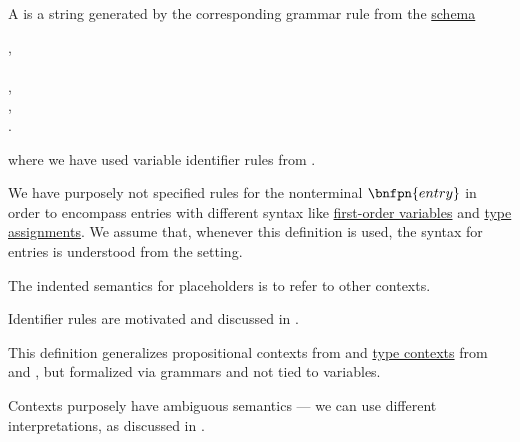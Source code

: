 \begin{definition}\label{def:logical_context}\mimprovised
  A  is a string generated by the corresponding grammar rule from the \hyperref[def:formal_grammar/schema]{schema}
  \begin{bnf*}
           {}, \\
      { \bnfor {} \bnfor} \\
    , \\
         {\bnfes}, \\
               { \bnfor {}}.
  \end{bnf*}
  where we have used variable identifier rules from .
\end{definition}
\begin{comments}
  \item We have purposely not specified rules for the nonterminal \( \bnfpn{entry} \) in order to encompass entries with different syntax like \hyperref[def:first_order_syntax/var]{first-order variables} and \hyperref[def:type_assignments]{type assignments}. We assume that, whenever this definition is used, the syntax for entries is understood from the setting.
  \item The indented semantics for placeholders is to refer to other contexts.
  \item Identifier rules are motivated and discussed in .
  \item This definition generalizes propositional contexts from \cite[45]{Mimram2020Types} and \hyperref[def:simple_type_system/context]{type contexts} from \cite[159]{Mimram2020Types} and \cite[def. 2A5]{Hindley1997STT}, but formalized via grammars and not tied to variables.
  \item Contexts purposely have ambiguous semantics --- we can use different interpretations, as discussed in .
\end{comments}

